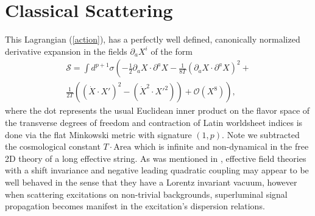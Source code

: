 \documentclass[%
 reprint,
 amsmath,amssymb,
 aps,
]{revtex4-1}
\begin{document}
\section{Classical Scattering}
This Lagrangian (\ref{action}), has a perfectly well defined, canonically normalized derivative expansion in the fields
$\partial_{a}X^i$ of the form
\begin{eqnarray}
    \mathcal{S} = \int d^{p+1} \sigma \left( -\frac{1}{2} \partial_{a} X \cdot \partial^{a} X - \frac{1}{8 T}
    (\partial_{a} X \cdot \partial^{a} X)^2 + \right . \nonumber\\
    \left . \frac{1}{2 T} ((\dot{X} \cdot X')^2 - (\dot{X}^2 \cdot X'^2)) + \mathcal{O}(X^8) \right) ,
    \nonumber
\end{eqnarray}
where the dot represents the usual Euclidean inner product on the flavor space of the transverse degrees of freedom and
contraction of Latin worldsheet indices is done via the flat Minkowski metric with signature $(1,p)$. Note we subtracted
the cosmological constant $T \cdot \mathrm{Area}$ which is infinite and non-dynamical in the free 2D theory of a long
effective string. As was mentioned in \cite{Adams:2006sv}, effective field theories with a shift invariance and negative
leading quadratic coupling may appear to be well behaved in the sense that they have a Lorentz invariant vacuum, however
when scattering excitations on non-trivial backgrounds, superluminal signal propagation becomes manifest in the
excitation's dispersion relations.
\end{document}
